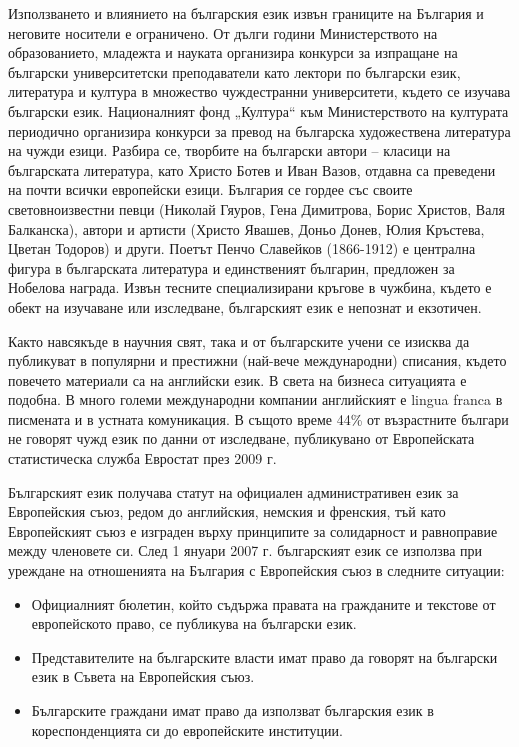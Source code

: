 \begin{multicols}{2}
  Използването и влиянието на българския език извън границите на България и неговите носители е ограничено. От дълги години Министерството на образованието, младежта и науката организира конкурси за изпращане на български университетски преподаватели като лектори по български език, литература и култура в множество чуждестранни университети, където се изучава български език. Националният фонд „Култура“ към Министерството на културата периодично организира конкурси за превод на българска художествена литература на чужди езици. Разбира се, творбите на български автори -- класици на българската литература, като Христо Ботев и Иван Вазов, отдавна са преведени на почти всички европейски езици. 
  България се гордее със своите световноизвестни певци (Николай Гяуров,
   Гена Димитрова, Борис Христов, Валя Балканска), автори и артисти (Христо Явашев, Доньо Донев, Юлия Кръстева, Цветан Тодоров) и други. Поетът Пенчо Славейков (1866-1912) е централна фигура в българската литература и единственият българин, предложен за Нобелова награда. Извън тесните специализирани кръгове в чужбина, където е обект на изучаване или изследване, българският език е непознат и екзотичен. 


  Както навсякъде в научния свят, така и от българските учени се изисква да публикуват в популярни и престижни (най-вече международни) списания, където повечето материали са на английски език. В света на бизнеса ситуацията е подобна. В много големи международни компании английският е lingua franca в писмената и в устната комуникация. В същото време 44\% от възрастните българи не говорят чужд език по данни от изследване, публикувано от Европейската статистическа служба Евростат \cite{epp} през 2009 г.

  Българският език получава статут на официален административен език за Европейския съюз, редом до английския, немския и френския, тъй като Европейският съюз е изграден върху принципите за солидарност и равноправие между членовете си. След 1 януари 2007 г. българският език се използва при уреждане на отношенията на България с Европейския съюз в следните ситуации:

  \begin{itemize}
  \item Официалният бюлетин, който съдържа правата на гражданите и текстове от европейското право, се публикува на български език. 
  \item Представителите на българските власти имат право да говорят на български език в Съвета на Европейския съюз. 
  \item Българските граждани имат право да използват българския език в кореспонденцията си до европейските институции.
  \end{itemize}


\end{multicols}
